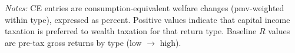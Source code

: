
\begin{table}[!htbp]
\centering
\caption{Per-Type Consumption-Equivalent Welfare Change and Baseline Return (WT vs CIT)}
\label{tab:ce_per_type_wt_vs_cit}


\vspace{0.4em}
\begin{minipage}{0.95\textwidth}
\footnotesize
\textit{Notes:} CE entries are consumption-equivalent welfare changes
(pmv-weighted within type), expressed as percent. Positive values indicate
that capital income taxation is preferred to wealth taxation for that return
type. Baseline $R$ values are pre-tax gross returns by type (low
$\rightarrow$ high).
\end{minipage}
\end{table}
